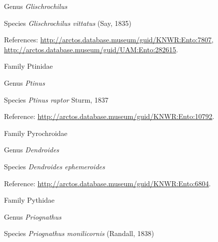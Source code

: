 \documentclass[9pt, article]{memoir}
\begin{document}
\begin{multicols}{2}
\vspace{6pt}\noindent\hspace{30pt}Genus \textit{Glischrochilus}


\vspace{6pt}\noindent\hspace{36pt}Species \textit{Glischrochilus vittatus} (Say, 1835)


\vspace{6pt}References: 
\url{http://arctos.database.museum/guid/KNWR:Ento:7807}, 
\url{http://arctos.database.museum/guid/UAM:Ento:282615}.

\vspace{6pt}\noindent\hspace{24pt}Family Ptinidae


\vspace{6pt}\noindent\hspace{30pt}Genus \textit{Ptinus}


\vspace{6pt}\noindent\hspace{36pt}Species \textit{Ptinus raptor} Sturm, 1837


\vspace{6pt}Reference: 
\url{http://arctos.database.museum/guid/KNWR:Ento:10792}.

\vspace{6pt}\noindent\hspace{24pt}Family Pyrochroidae


\vspace{6pt}\noindent\hspace{30pt}Genus \textit{Dendroides}


\vspace{6pt}\noindent\hspace{36pt}Species \textit{Dendroides ephemeroides}


\vspace{6pt}Reference: 
\url{http://arctos.database.museum/guid/KNWR:Ento:6804}.

\vspace{6pt}\noindent\hspace{24pt}Family Pythidae


\vspace{6pt}\noindent\hspace{30pt}Genus \textit{Priognathus}


\vspace{6pt}\noindent\hspace{36pt}Species \textit{Priognathus monilicornis} (Randall, 1838)



\end{multicols}
\end{document}
